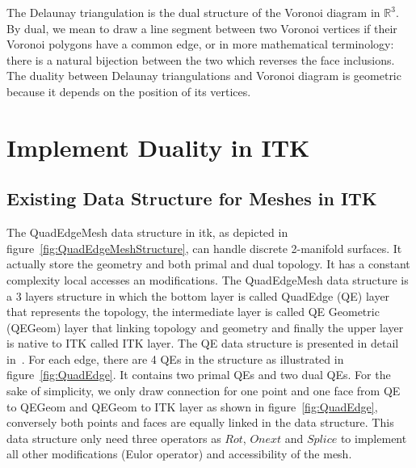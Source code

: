\documentclass{InsightArticle}
\begin{document}
The Delaunay triangulation is the dual structure of the Voronoi diagram in  $\mathbb{R}^3$. By dual, we mean to draw a line segment between two Voronoi vertices if their Voronoi polygons have a common edge, or in more mathematical terminology: there is a natural bijection between the two which reverses the face inclusions. The duality between Delaunay triangulations and Voronoi diagram is geometric because it depends on the position of its vertices.
\section{Implement Duality in ITK}
\subsection{Existing Data Structure for Meshes in ITK}
The QuadEdgeMesh data structure in itk, as depicted in figure~\ref{fig:QuadEdgeMeshStructure}, can handle discrete 2-manifold surfaces. It actually store the geometry and both primal and dual topology. It has a constant complexity local accesses an modifications. The QuadEdgeMesh data structure is a 3 layers structure in which the bottom layer is called QuadEdge (QE) layer that represents the topology, the intermediate layer is called QE Geometric (QEGeom) layer that linking topology and geometry and finally the upper layer is native to ITK called ITK layer. The QE data structure is presented in detail in~\cite{Gouaillard2006}. For each edge, there are 4 QEs in the structure as illustrated in figure~\ref{fig:QuadEdge}. It contains two primal QEs and two dual QEs. For the sake of simplicity, we only draw connection for one point and one face from QE to QEGeom and QEGeom to ITK layer as shown in figure~\ref{fig:QuadEdge}, conversely both points and faces are equally linked in the data structure. This data structure only need three operators as $Rot$, $Onext$ and $Splice$ to implement all other modifications (Eulor operator) and accessibility of the mesh. 
\end{document}
